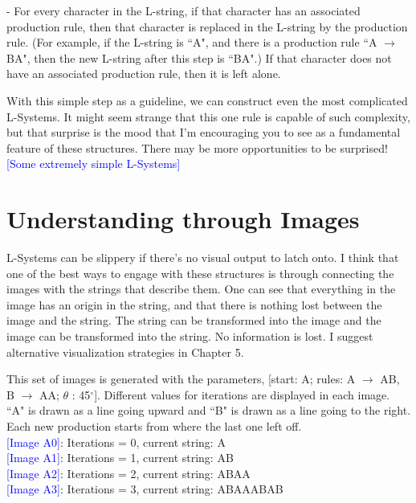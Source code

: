 \documentclass[12pt,twoside]{reedthesis}
\begin{document}
	\begin{addmargin}[4em]{4em}
	- For every character in the L-string, if that character has an associated production rule, then that character is replaced in the L-string by the production rule. (For example, if the L-string is ``A", and there is a production rule ``A $\rightarrow$ BA", then the new L-string after this step is ``BA".) If that character does not have an associated production rule, then it is left alone.\\
	 \end{addmargin}
	 
	 With this simple step as a guideline, we can construct even the most complicated L-Systems. It might seem strange that this one rule is capable of such complexity, but that surprise is the mood that I'm encouraging you to see as a fundamental feature of these structures. There may be more opportunities to be surprised!\\

	\textcolor{blue}{[Some extremely simple L-Systems]}\\

\section{Understanding through Images}

	L-Systems can be slippery if there's no visual output to latch onto. I think that one of the best ways to engage with these structures is through connecting the images with the strings that describe them. One can see that everything in the image has an origin in the string, and that there is nothing lost between the image and the string. The string can be transformed into the image and the image can be transformed into the string. No information is lost. I suggest alternative visualization strategies in Chapter 5.

This set of images is generated with the parameters, [start: A; rules: A $\rightarrow$ AB, B $\rightarrow$ AA; $\theta$ : 45$^{\circ}$]. Different values for iterations are displayed in each image. ``A" is drawn as a line going upward and ``B" is drawn as a line going to the right. Each new production starts from where the last one left off. 
\\\textcolor{blue}{[Image A0]}: Iterations = 0, current string: A
\\\textcolor{blue}{[Image A1]}: Iterations = 1, current string: AB
\\\textcolor{blue}{[Image A2]}: Iterations = 2, current string: ABAA
\\\textcolor{blue}{[Image A3]}: Iterations = 3, current string: ABAAABAB \\
\end{document}
